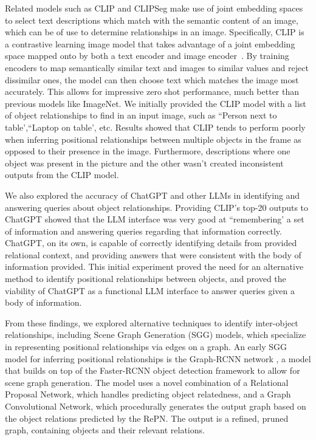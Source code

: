 \documentclass[letterpaper, 10 pt, conference]{ieeeconf}  %
\begin{document}
    Related models such as CLIP and CLIPSeg \cite{lueddecke22_cvpr} make use of joint embedding spaces to select text descriptions which match with the semantic content of an image, which can be of use to determine relationships in an image. Specifically, CLIP is a contrastive learning image model that takes advantage of a joint embedding space mapped onto by both a text encoder and image encoder~\cite{radford2021learning}. By training encoders to map semantically similar text and images to similar values and reject dissimilar ones, the model can then choose text which matches the image most accurately. This allows for impressive zero shot performance, much better than previous models like ImageNet. We initially provided the CLIP model with a list of object relationships to find in an input image, such as ``Person next to table',``Laptop on table', etc. Results showed that CLIP tends to perform poorly when inferring positional relationships between multiple objects in the frame as opposed to their presence in the image. Furthermore, descriptions where one object was present in the picture and the other wasn't created inconsistent outputs from the CLIP model.

    We also explored the accuracy of ChatGPT and other LLMs in identifying and answering queries about object relationships. Providing CLIP's top-20 outputs to ChatGPT showed that the LLM interface was very good at ``remembering' a set of information and answering queries regarding that information correctly. ChatGPT, on its own, is capable of correctly identifying details from provided relational context, and providing answers that were consistent with the body of information provided. This initial experiment proved the need for an alternative method to identify positional relationships between objects, and proved the viability of ChatGPT as a functional LLM interface to answer queries given a body of information.

    From these findings, we explored alternative techniques to identify inter-object relationships, including Scene Graph Generation (SGG) models, which specialize in representing positional relationships via edges on a graph. An early SGG model for inferring positional relationships is the Graph-RCNN network \cite{yang2018graph}, a model that builds on top of the Faster-RCNN object detection framework to allow for scene graph generation. The model uses a novel combination of a Relational Proposal Network, which handles predicting object relatedness, and a Graph Convolutional Network, which procedurally generates the output graph based on the object relations predicted by the RePN. The output is a refined, pruned graph, containing objects and their relevant relations. 
    
\end{document}
